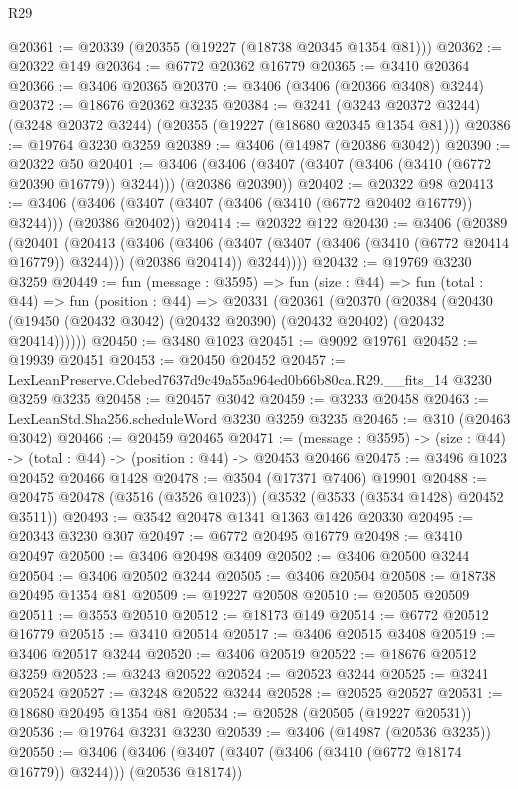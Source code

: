 \begin{lexlean}{R29}
\begin{coremodule}
@20361 := @20339 (@20355 (@19227 (@18738 @20345 @1354 @81)))
@20362 := @20322 @149
@20364 := @6772 @20362 @16779
@20365 := @3410 @20364
@20366 := @3406 @20365
@20370 := @3406 (@3406 (@20366 @3408) @3244)
@20372 := @18676 @20362 @3235
@20384 := @3241
    (@3243 @20372 @3244)
    (@3248 @20372 @3244)
    (@20355 (@19227 (@18680 @20345 @1354 @81)))
@20386 := @19764 @3230 @3259
@20389 := @3406 (@14987 (@20386 @3042))
@20390 := @20322 @50
@20401 := @3406 (@3406 (@3407 (@3407 (@3406 (@3410 (@6772 @20390 @16779)) @3244))) (@20386 @20390))
@20402 := @20322 @98
@20413 := @3406 (@3406 (@3407 (@3407 (@3406 (@3410 (@6772 @20402 @16779)) @3244))) (@20386 @20402))
@20414 := @20322 @122
@20430 := @3406
    (@20389
      (@20401
        (@20413
          (@3406
            (@3406 (@3407 (@3407 (@3406 (@3410 (@6772 @20414 @16779)) @3244))) (@20386 @20414))
            @3244))))
@20432 := @19769 @3230 @3259
@20449 := fun (message : @3595) =>
  fun (size : @44) =>
  fun (total : @44) =>
  fun (position : @44) =>
  @20331
    (@20361
      (@20370
        (@20384 (@20430 (@19450 (@20432 @3042) (@20432 @20390) (@20432 @20402) (@20432 @20414))))))
@20450 := @3480 @1023
@20451 := @9092 @19761
@20452 := @19939 @20451
@20453 := @20450 @20452
@20457 := LexLeanPreserve.Cdebed7637d9c49a55a964ed0b66b80ca.R29.__fits_14 @3230 @3259 @3235
@20458 := @20457 @3042
@20459 := @3233 @20458
@20463 := LexLeanStd.Sha256.scheduleWord @3230 @3259 @3235
@20465 := @310 (@20463 @3042)
@20466 := @20459 @20465
@20471 := (message : @3595) -> (size : @44) -> (total : @44) -> (position : @44) -> @20453 @20466
@20475 := @3496 @1023 @20452 @20466 @1428
@20478 := @3504 (@17371 @7406) @19901
@20488 := @20475 @20478 (@3516 (@3526 @1023)) (@3532 (@3533 (@3534 @1428) @20452 @3511))
@20493 := @3542 @20478 @1341 @1363 @1426 @20330
@20495 := @20343 @3230 @307
@20497 := @6772 @20495 @16779
@20498 := @3410 @20497
@20500 := @3406 @20498 @3409
@20502 := @3406 @20500 @3244
@20504 := @3406 @20502 @3244
@20505 := @3406 @20504
@20508 := @18738 @20495 @1354 @81
@20509 := @19227 @20508
@20510 := @20505 @20509
@20511 := @3553 @20510
@20512 := @18173 @149
@20514 := @6772 @20512 @16779
@20515 := @3410 @20514
@20517 := @3406 @20515 @3408
@20519 := @3406 @20517 @3244
@20520 := @3406 @20519
@20522 := @18676 @20512 @3259
@20523 := @3243 @20522
@20524 := @20523 @3244
@20525 := @3241 @20524
@20527 := @3248 @20522 @3244
@20528 := @20525 @20527
@20531 := @18680 @20495 @1354 @81
@20534 := @20528 (@20505 (@19227 @20531))
@20536 := @19764 @3231 @3230
@20539 := @3406 (@14987 (@20536 @3235))
@20550 := @3406 (@3406 (@3407 (@3407 (@3406 (@3410 (@6772 @18174 @16779)) @3244))) (@20536 @18174))

\end{coremodule}
\end{lexlean}
